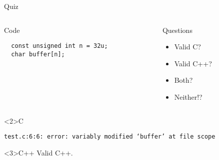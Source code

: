 \documentclass[presentation,aspectratio=169]{beamer}
\begin{document}
\begin{frame}[fragile,label={sec:org23c4234}]{Quiz}
\begin{columns}
\begin{column}{0.48\columnwidth}
\begin{block}{Code}
\begin{verbatim}
  const unsigned int n = 32u;
  char buffer[n];
\end{verbatim}
\end{block}
\end{column}

\begin{column}{0.48\columnwidth}
\begin{block}{Questions}
\begin{itemize}
\item Valid C?
\item Valid C++?
\item Both?
\item Neither!?
\end{itemize}
\end{block}
\end{column}
\end{columns}

\begin{block}<2>{C}
\begin{verbatim}
test.c:6:6: error: variably modified ‘buffer’ at file scope
\end{verbatim}
\end{block}

\vspace{-1cm}
\begin{block}<3>{C++}
Valid C++.
\end{block}
\end{frame}

\end{document}
